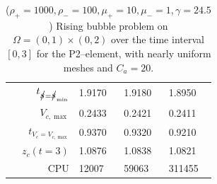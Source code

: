 \begin{table}
\begin{tabular}{rlll}
$t_{\strikes = \strikes_{\min}}$ & 1.9170 & 1.9180 & 1.8950 \\
$V_{c,\max}$                     & 0.2433 & 0.2421 & 0.2411 \\
$t_{V_c = V_{c,\max}}$           & 0.9370 & 0.9320 & 0.9210 \\
$z_c(t=3)$                       & 1.0876 & 1.0838 & 1.0821 \\
CPU                              &  12007 &  59063 & 311455 \\
\hline
\end{tabular}
\hspace*{-3.25cm}
\caption[Navier--Stokes 2d rising bubble benchmark values P2--\pdg]
{($\rho_+ = 1000,\rho_- = 100,\mu_+ = 10,\mu_- =1,\gamma = 24.5$)
Rising bubble problem on ${\Omega = (0,1) \times (0,2)}$ over the time interval
$[0,3]$ for the P2--\pdg element, with nearly uniform meshes and
$C_a=20$\textdegree.}
\label{tab:risingbubble2Dp2p1dg}
\end{table}

